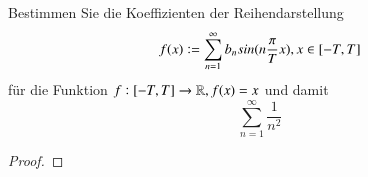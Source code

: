 
\begin{exercise}
	Bestimmen Sie die Koeffizienten der Reihendarstellung 
	\begin{equation*}
		f(x) := \sum_{n=1}^\infty b_n sin(n \frac{\pi}{T} x), x \in [-T, T] \\	
	\end{equation*}
	für die Funktion $f: [-T, T] \to \mathbb{R}, f(x) = x$ und damit
	\begin{equation*}
	\sum_{n=1}^\infty \frac{1}{n^2}
	\end{equation*}
\end{exercise}

\begin{proof}
	
\end{proof}
